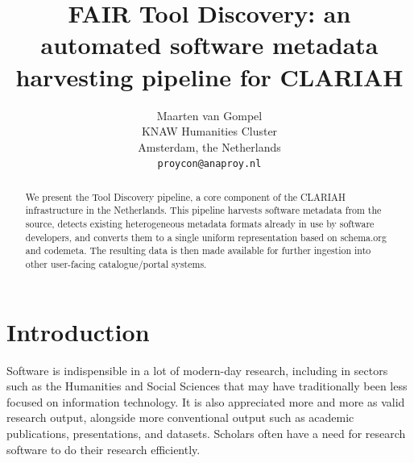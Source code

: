 \documentclass[a4paper,11pt]{article}
\title{FAIR Tool Discovery: an automated software metadata harvesting pipeline for CLARIAH}
\author{Maarten van Gompel \\
  KNAW Humanities Cluster \\
  Amsterdam, the Netherlands \\
  {\tt proycon@anaproy.nl} %
}
\date{}
\begin{document}
\maketitle
\begin{abstract}
  We present the Tool Discovery pipeline, a core component of the CLARIAH
    infrastructure in the Netherlands. This pipeline harvests software metadata
    from the source, detects existing heterogeneous metadata formats already in
    use by software developers, and converts them to a single uniform representation
    based on schema.org and codemeta. The resulting data is then made available
    for further ingestion into other user-facing catalogue/portal systems. 
\end{abstract}

\section{Introduction} \label{intro}

%

Software is indispensible in a lot of modern-day research, including in sectors
such as the Humanities and Social Sciences that may have traditionally been
less focused on information technology. It is also appreciated more and more as
valid research output, alongside more conventional output such as academic
publications, presentations, and datasets. Scholars often have a need for
research software to do their research efficiently.
\end{document}
